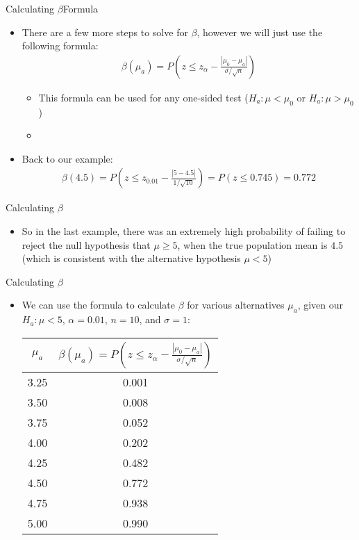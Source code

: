 \documentclass[xcolor=dvipsnames]{beamer}
\begin{document}
\begin{frame}{Calculating $\beta$}{Formula}
	\begin{itemize}
		\item There are a few more steps to solve for $\beta$, however we will just use the following formula:
		\begin{gather*}
			\beta(\mu_a) = P\left(z \leq z_{\alpha} - \frac{|\mu_0 - \mu_a|}{\sigma / \sqrt{n}} \right)
		\end{gather*} \pause
		\begin{itemize}
			\item This formula can be used for any one-sided test ($H_a: \mu < \mu_0$ or $H_a: \mu > \mu_0$) \pause
			\item[]
		\end{itemize}
	\item Back to our example: \pause
	\begin{align*}
	\beta(4.5) = P\left(z \leq z_{0.01} - \frac{|5 - 4.5|}{1 / \sqrt{10}} \right) = P(z \leq 0.745) = 0.772
	\end{align*}
	\end{itemize}
\end{frame}

\begin{frame}{Calculating $\beta$}
	\begin{itemize}
		\item So in the last example, there was an extremely high probability of failing to reject the null hypothesis that $\mu \geq 5$, when the true population mean is $4.5$ (which is consistent with the alternative hypothesis $\mu < 5$)
	\end{itemize}
\end{frame}

\begin{frame}{Calculating $\beta$}
	\begin{itemize}
		\item We can use the formula to calculate $\beta$ for various alternatives $\mu_a$, given our $H_a: \mu < 5$, $\alpha = 0.01$, $n = 10$, and $\sigma = 1$: 
		\vspace{5mm}
		\begin{center}
			\begin{tabular}{|c|c|}
				\hline 
				$\mu_a$ & $\beta(\mu_a)= P\left(z \leq z_{\alpha} - \frac{|\mu_0 - \mu_a|}{\sigma / \sqrt{n}} \right)$ \\ \hline \hline
				3.25 & 0.001 \\ \hline 
				3.50& 0.008 \\ \hline 
				3.75& 0.052 \\ \hline 
				4.00& 0.202 \\ \hline 
				4.25& 0.482\\ \hline 
				4.50& 0.772 \\ \hline 
				4.75& 0.938\\ \hline 
				5.00& 0.990\\ \hline 
			\end{tabular}
		\end{center}
	\end{itemize}
\end{frame}
\end{document}
